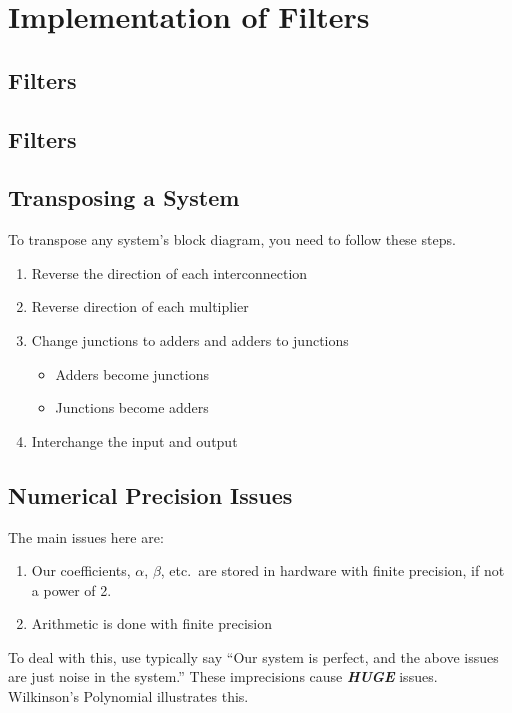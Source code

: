 \section{Implementation of Filters}\label{sec:Filter_Implementation}
\subsection{ Filters}\label{subsec:Filter_Implementation-FIR}
\subsection{ Filters}\label{subsec:Filter_Implementation-IIR}
\subsection{Transposing a System}\label{subsec:Filter_Implementation-Transposing_System}
To transpose any system's block diagram, you need to follow these steps.
\begin{enumerate}[noitemsep]
\item Reverse the direction of each interconnection
\item Reverse direction of each multiplier
\item Change junctions to adders and adders to junctions
  \begin{itemize}[noitemsep]
  \item Adders become junctions
  \item Junctions become adders
  \end{itemize}
\item Interchange the input and output
\end{enumerate}

\subsection{Numerical Precision Issues}\label{subsec:Filter_Implementation-Numerical_Precision_Issues}
The main issues here are:
\begin{enumerate}[noitemsep]
\item Our coefficients, $\alpha$, $\beta$, etc.\ are stored in hardware with finite precision, if not a power of 2.
\item Arithmetic is done with finite precision
\end{enumerate}

To deal with this, use typically say ``Our system is perfect, and the above issues are just noise in the system.''
These imprecisions cause \textbf{\emph{\large{HUGE}}} issues.
Wilkinson's Polynomial illustrates this.

